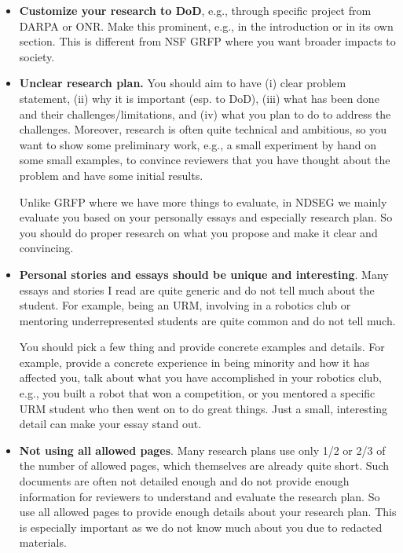 \documentclass[oneside,11pt,dvipsnames]{book}
\begin{document}
\begin{itemize}

    \item \textbf{Customize your research to DoD}, e.g., through specific project from DARPA or ONR. 
    Make this prominent, e.g., in the introduction or in its own section.  This is different from NSF GRFP where you want broader impacts to society.

    \item \textbf{Unclear research plan.}
     You should aim to have (i) clear problem statement, (ii) why it is important (esp. to DoD), (iii) what has been done and their challenges/limitations, and (iv) what you plan to do to address the challenges.  Moreover, research is often quite technical and ambitious, so you want to show some preliminary work, e.g., a small experiment by hand on some small examples, to convince reviewers that you have thought about the problem and have some initial results.
    
    
    Unlike GRFP where we have more things to evaluate, in NDSEG we mainly evaluate you based on your personally essays and especially research plan. So you should do proper research on what you propose and make it clear and convincing.

    \item \textbf{Personal stories and essays should be unique and interesting}. Many essays and stories I read are quite generic and do not tell much about the student. For example, being an URM, involving in a robotics club or mentoring underrepresented students are quite common and do not tell much.
    
    You should pick a few thing and provide concrete examples and details.  For example, provide a concrete experience in being minority and how it has affected you, talk about what you have accomplished in your robotics club, e.g., you built a robot that won a competition, or you mentored a specific URM student who then went on to do great things.  Just a small, interesting detail can make your essay stand out.
    
    \item \textbf{Not using all allowed pages}. Many research plans use only 1/2 or 2/3 of the number of allowed pages, which themselves are already quite short. Such documents are often not detailed enough and do not provide enough information for reviewers to understand and evaluate the research plan.  So use all allowed pages to provide enough details about your research plan. This is especially important as we do not know much about you due to redacted materials.
    


\end{itemize}
\end{document}
